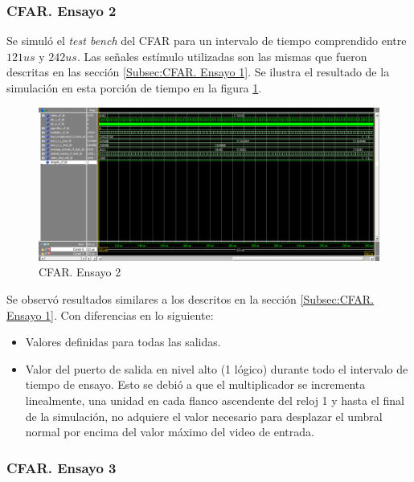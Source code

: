\subsubsection{CFAR. Ensayo 2}
\label{Subsec:CFAR. Ensayo 2}

Se simuló el \textit{test bench} del CFAR para un intervalo de tiempo comprendido entre $121 us$ y $242 us$. Las señales estímulo utilizadas son las mismas que fueron descritas en las sección \ref{Subsec:CFAR. Ensayo 1}. Se ilustra el resultado de la simulación en esta porción de tiempo en la figura \ref{fig:cfar_ensayo_2}.

\begin{figure}
\centering
\includegraphics[scale=0.52, angle=270]{./Figures/cfar_ensayo_2.png}
\caption{CFAR. Ensayo 2}
\label{fig:cfar_ensayo_2}
\end{figure}


Se observó resultados similares a los descritos en la sección \ref{Subsec:CFAR. Ensayo 1}. Con diferencias en lo siguiente:

\begin{itemize}
\item
Valores definidas para todas las salidas.

\item
Valor del puerto de salida en nivel alto (1 lógico) durante todo el intervalo de tiempo de ensayo. Esto se debió a que el multiplicador se incrementa linealmente, una unidad en cada flanco ascendente del reloj 1 y hasta el final de la simulación, no adquiere el valor necesario para desplazar el umbral normal por encima del valor máximo del video de entrada.
\end{itemize}



\subsubsection{CFAR. Ensayo 3}
\label{Subsec:CFAR. Ensayo 3}

